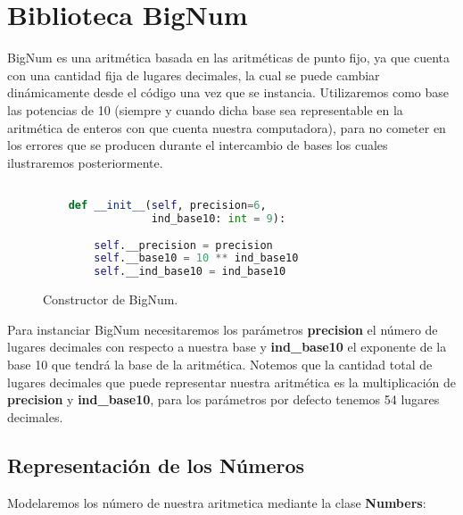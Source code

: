 \documentclass[a4paper,10pt,twocolumn]{article}
\begin{document}
\section{Biblioteca BigNum}\label{sec:dev}
	BigNum es una aritmética basada en las aritméticas de punto fijo, ya que cuenta con una cantidad fija de lugares decimales, la cual se puede cambiar dinámicamente desde el código una vez que se instancia. Utilizaremos como base las potencias de 10 (siempre y cuando dicha base sea representable en la aritmética de enteros con que cuenta nuestra computadora), para no cometer en los errores que se producen durante el intercambio de bases los cuales ilustraremos posteriormente.

  

		\begin{figure}[htb]%
			\begin{lstlisting}[language=python]%

    def __init__(self, precision=6,
                 ind_base10: int = 9):
                 
        self.__precision = precision
        self.__base10 = 10 ** ind_base10
        self.__ind_base10 = ind_base10


			\end{lstlisting}
		\caption{Constructor de BigNum.\label{fig:code}}
		\end{figure}
	
	Para instanciar BigNum necesitaremos los parámetros \textbf{precision} el número de lugares decimales con respecto a nuestra base y \textbf{ind\_base10} el exponente de la base 10 que tendrá la base de la aritmética. Notemos que la cantidad total de lugares decimales que puede representar nuestra aritmética es la multiplicación de
\textbf{precision} y  \textbf{ind\_base10}, para los parámetros por defecto tenemos 54 lugares decimales.
  
	
\subsection{Representación de los Números}\label{sub:result}
	Modelaremos los número de nuestra aritmetica mediante la clase \textbf{Numbers}:
\end{document}
